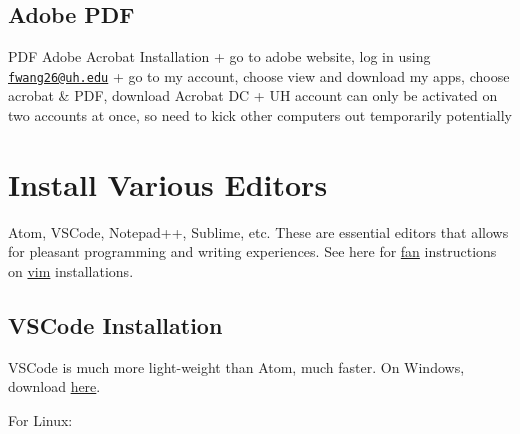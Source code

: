 \documentclass[]{article}
\begin{document}
\hypertarget{adobe-pdf}{%
\subsection{Adobe PDF}\label{adobe-pdf}}

PDF Adobe Acrobat Installation + go to adobe website, log in using
\href{mailto:fwang26@uh.edu}{\nolinkurl{fwang26@uh.edu}} + go to my
account, choose view and download my apps, choose acrobat \& PDF,
download Acrobat DC + UH account can only be activated on two accounts
at once, so need to kick other computers out temporarily potentially

\hypertarget{install-various-editors}{%
\section{Install Various Editors}\label{install-various-editors}}

Atom, VSCode, Notepad++, Sublime, etc. These are essential editors that
allows for pleasant programming and writing experiences. See here for
\href{http://fanwangecon.github.io/}{fan} instructions on
\href{https://fanwangecon.github.io/Tex4Econ/nontex/install/linux/fn_vim.html}{vim}
installations.

\hypertarget{vscode-installation}{%
\subsection{VSCode Installation}\label{vscode-installation}}

VSCode is much more light-weight than Atom, much faster. On Windows,
download \href{https://code.visualstudio.com/download}{here}.

For Linux:
\end{document}
